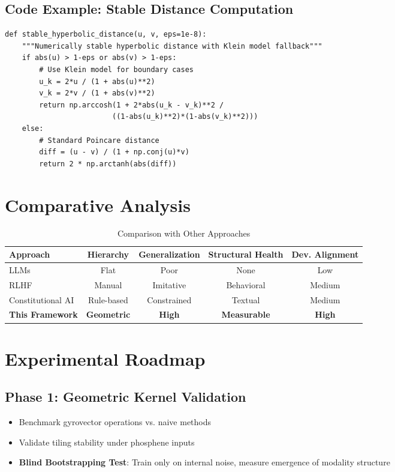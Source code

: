\documentclass[10pt]{article}
\begin{document}
\subsection{Code Example: Stable Distance Computation}

\begin{lstlisting}[caption={Stable Hyperbolic Distance},label=lst:distance]
def stable_hyperbolic_distance(u, v, eps=1e-8):
    """Numerically stable hyperbolic distance with Klein model fallback"""
    if abs(u) > 1-eps or abs(v) > 1-eps:
        # Use Klein model for boundary cases
        u_k = 2*u / (1 + abs(u)**2)  
        v_k = 2*v / (1 + abs(v)**2)
        return np.arccosh(1 + 2*abs(u_k - v_k)**2 / 
                         ((1-abs(u_k)**2)*(1-abs(v_k)**2)))
    else:
        # Standard Poincare distance
        diff = (u - v) / (1 + np.conj(u)*v)
        return 2 * np.arctanh(abs(diff))
\end{lstlisting}

\section{Comparative Analysis}

\begin{table}[H]
\centering
\caption{Comparison with Other Approaches}
\begin{tabular}{lcccc}
\toprule
Approach & Hierarchy & Generalization & Structural Health & Dev. Alignment \\
\midrule
LLMs & Flat & Poor & None & Low \\
RLHF & Manual & Imitative & Behavioral & Medium \\
Constitutional AI & Rule-based & Constrained & Textual & Medium \\
\textbf{This Framework} & \textbf{Geometric} & \textbf{High} & \textbf{Measurable} & \textbf{High} \\
\bottomrule
\end{tabular}
\end{table}

\section{Experimental Roadmap}

\subsection{Phase 1: Geometric Kernel Validation}
\begin{itemize}
    \item Benchmark gyrovector operations vs. naive methods
    \item Validate tiling stability under phosphene inputs
    \item \textbf{Blind Bootstrapping Test}: Train only on internal noise, measure emergence of modality structure
\end{itemize}
\end{document}
